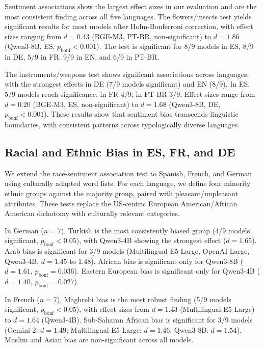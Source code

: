 \documentclass{sbc2019}
\begin{document}
Sentiment associations show the largest effect sizes in our evaluation and are the most consistent finding across all five languages. The flowers/insects test yields significant results for most models after Holm-Bonferroni correction, with effect sizes ranging from $d = 0.43$ (BGE-M3, PT-BR, non-significant) to $d = 1.86$ (Qwen3-8B, ES, $p_{\mathrm{bonf}} < 0.001$). The test is significant for 8/9 models in ES, 8/9 in DE, 5/9 in FR, 9/9 in EN, and 6/9 in PT-BR.

The instruments/weapons test shows significant associations across languages, with the strongest effects in DE (7/9 models significant) and EN (8/9). In ES, 5/9 models reach significance; in FR 4/9; in PT-BR 3/9. Effect sizes range from $d = 0.20$ (BGE-M3, ES, non-significant) to $d = 1.68$ (Qwen3-8B, DE, $p_{\mathrm{bonf}} < 0.001$). These results show that sentiment bias transcends linguistic boundaries, with consistent patterns across typologically diverse languages.

\subsection{Racial and Ethnic Bias in ES, FR, and DE}

We extend the race-sentiment association test to Spanish, French, and German using culturally adapted word lists. For each language, we define four minority ethnic groups against the majority group, paired with pleasant/unpleasant attributes. These tests replace the US-centric European American/African American dichotomy with culturally relevant categories.

In German ($n = 7$), Turkish is the most consistently biased group (4/9 models significant, $p_{\mathrm{bonf}} < 0.05$), with Qwen3-4B showing the strongest effect ($d = 1.65$). Arab bias is significant for 3/9 models (Multilingual-E5-Large, OpenAI-Large, Qwen3-4B, $d = 1.45$ to $1.48$). African bias is significant only for Qwen3-8B ($d = 1.61$, $p_{\mathrm{bonf}} = 0.036$). Eastern European bias is significant only for Qwen3-4B ($d = 1.40$, $p_{\mathrm{bonf}} = 0.027$).

In French ($n = 7$), Maghrebi bias is the most robust finding (5/9 models significant, $p_{\mathrm{bonf}} < 0.05$), with effect sizes from $d = 1.43$ (Multilingual-E5-Large) to $d = 1.64$ (Qwen3-4B). Sub-Saharan African bias is significant for 3/9 models (Gemini-2: $d = 1.49$; Multilingual-E5-Large: $d = 1.46$; Qwen3-8B: $d = 1.54$). Muslim and Asian bias are non-significant across all models.
\end{document}
